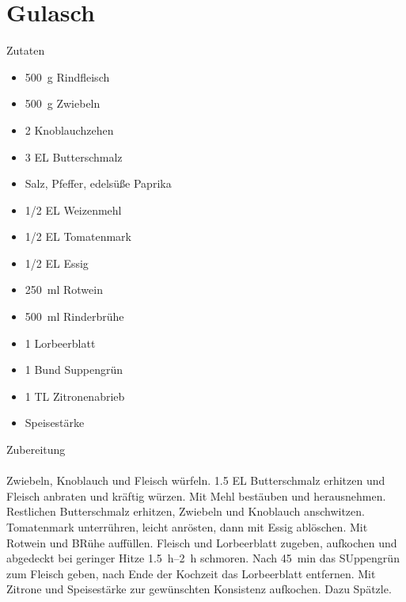 \section*{Gulasch}
\ihead{}\ohead{}
\cfoot{}
{\Large Zutaten}
\begin{multicols}{2}
\begin{itemize}
    \item \SI{500}{g} Rindfleisch
    \item \SI{500}{g} Zwiebeln
    \item \num{2} Knoblauchzehen
    \item \num{3} EL Butterschmalz
    \item Salz, Pfeffer, edelsüße Paprika
    \item \num{1/2} EL Weizenmehl
    \item \num{1/2} EL Tomatenmark
    \item \num{1/2} EL Essig
    \item \SI{250}{ml} Rotwein
    \item \SI{500}{ml} Rinderbrühe
    \item \num{1} Lorbeerblatt
    \item \num{1} Bund Suppengrün
    \item \num{1} TL Zitronenabrieb
    \item Speisestärke
\end{itemize}
\end{multicols}
\noindent
{\Large Zubereitung}\\
\\
Zwiebeln, Knoblauch und Fleisch würfeln.
\num{1.5} EL Butterschmalz erhitzen und Fleisch anbraten und kräftig würzen.
Mit Mehl bestäuben und herausnehmen.
Restlichen Butterschmalz erhitzen, Zwiebeln und Knoblauch anschwitzen.
Tomatenmark unterrühren, leicht anrösten, dann mit Essig ablöschen.
Mit Rotwein und BRühe auffüllen. 
Fleisch und Lorbeerblatt zugeben, aufkochen und abgedeckt bei geringer Hitze \SIrange{1.5}{2}{h} schmoren.
Nach \SI{45}{min} das SUppengrün zum Fleisch geben, nach Ende der Kochzeit das Lorbeerblatt entfernen.
Mit Zitrone und Speisestärke zur gewünschten Konsistenz aufkochen.
Dazu Spätzle.